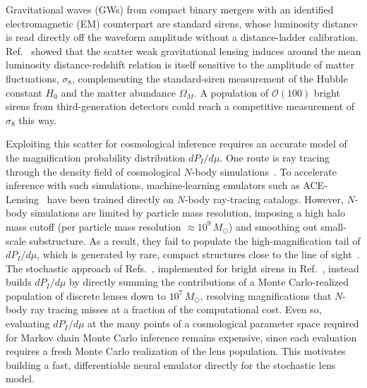 \documentclass[aps,prd,10pt,nofootinbib,twocolumn,superscriptaddress,floatfix,notitlepage]{revtex4-1}
\newcommand{\Msun}{M_\odot}
\begin{document}
Gravitational waves (GWs) from compact binary mergers with an identified electromagnetic (EM) counterpart are standard sirens, whose luminosity distance is read directly off the waveform amplitude without a distance-ladder calibration. Ref.~\cite{Vaskonen:2026ubd} showed that the scatter weak gravitational lensing induces around the mean luminosity distance-redshift relation is itself sensitive to the amplitude of matter fluctuations, $\sigma_8$, complementing the standard-siren measurement of the Hubble constant $H_0$ and the matter abundance $\Omega_M$. A population of $\mathcal{O}(100)$ bright sirens from third-generation detectors could reach a competitive measurement of $\sigma_8$ this way.

Exploiting this scatter for cosmological inference requires an accurate model of the magnification probability distribution $dP_I/d\mu$. One route is ray tracing through the density field of cosmological $N$-body simulations~\cite{Holz:1997ic,Holz:2004xx,Takahashi:2011qd,Takahashi:2017hjr}. To accelerate inference with such simulations, machine-learning emulators such as ACE-Lensing~\cite{Turker:2025rdt} have been trained directly on $N$-body ray-tracing catalogs. However, $N$-body simulations are limited by particle mass resolution, imposing a high halo mass cutoff (per particle mass resolution $\approx 10^{9}\,\Msun$) and smoothing out small-scale substructure. As a result, they fail to populate the high-magnification tail of $dP_I/d\mu$, which is generated by rare, compact structures close to the line of sight~\cite{DES:2025omh}. The stochastic approach of Refs.~\cite{Kainulainen:2009dw,Kainulainen:2010at,Kainulainen:2011zx}, implemented for bright sirens in Ref.~\cite{Vaskonen:2026ubd}, instead builds $dP_I/d\mu$ by directly summing the contributions of a Monte Carlo-realized population of discrete lenses down to $10^7\,\Msun$, resolving magnifications that $N$-body ray tracing misses at a fraction of the computational cost. Even so, evaluating $dP_I/d\mu$ at the many points of a cosmological parameter space required for Markov chain Monte Carlo inference remains expensive, since each evaluation requires a fresh Monte Carlo realization of the lens population. This motivates building a fast, differentiable neural emulator directly for the stochastic lens model.
\end{document}
